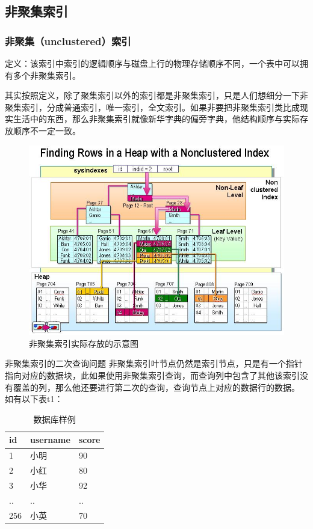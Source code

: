 \documentclass[UTF8]{ctexart}
\begin{document}
\subsection{非聚集索引}
\subsubsection{非聚集（unclustered）索引}

定义：该索引中索引的逻辑顺序与磁盘上行的物理存储顺序不同，一个表中可以拥有多个非聚集索引。

其实按照定义，除了聚集索引以外的索引都是非聚集索引，只是人们想细分一下非聚集索引，分成普通索引，唯一索引，全文索引。如果非要把非聚集索引类比成现实生活中的东西，那么非聚集索引就像新华字典的偏旁字典，他结构顺序与实际存放顺序不一定一致。
\begin{figure}[htbp]
\centering
\includegraphics[height=1\linewidth,width=1\textwidth]{Figure/index1.png}
\caption{非聚集索引实际存放的示意图}
\end{figure}
非聚集索引的二次查询问题
非聚集索引叶节点仍然是索引节点，只是有一个指针指向对应的数据块，此如果使用非聚集索引查询，而查询列中包含了其他该索引没有覆盖的列，那么他还要进行第二次的查询，查询节点上对应的数据行的数据。
如有以下表t1：
\begin{table}[]
    \caption{数据库样例}
    \vspace{20pt}
    \centering
    \begin{tabular}{p{3cm}p{2.5cm}p{2.5cm}}
        \hline
        id  & username & score\\
        \hline
        1	&小明	&90\\
		2	&小红&	80\\
		3	&小华&	92\\
		..	&..	&..\\
		256	&小英&	70\\
        \hline       
    \end{tabular}
    \label{bs2}
\end{table}
\end{document}
